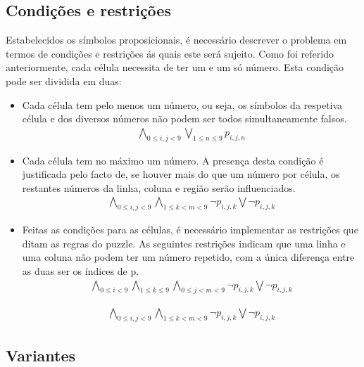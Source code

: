 \documentclass[a4paper,12pt]{article}
\begin{document}
\subsection{Condições e restrições}
Estabelecidos os símbolos proposicionais, é necessário descrever o problema em
termos de condições e restrições ás quais este será sujeito.  Como foi referido
anteriormente, cada célula necessita de ter um e um só número. Esta condição
pode ser dividida em duas:
\begin{itemize}
     \item Cada célula tem pelo menos um número, ou seja, os símbolos da
        respetiva célula e dos diversos números não podem ser todos
        simultaneamente falsos.
        \begin{align}
        \bigwedge_{0\leq i,j < 9}
           \bigvee_{1\leq n \leq 9} p_{i,j,n}
        \end{align}
     
     \item Cada célula tem no máximo um número. A presença desta condição é justificada pelo facto de, se houver mais do que um número por célula, os restantes números da linha, coluna e região serão influenciados.
        \begin{align}
        \bigwedge_{0\leq i,j < 9}
         \bigwedge_{1\leq k < m < 9} \lnot p_{i,j,k}
           \bigvee \lnot p_{i,j,k}
        \end{align}
     
      \item Feitas as condições para as células, é necessário implementar as
         restrições que ditam as regras do puzzle.  As seguintes restrições
         indicam que uma linha e uma coluna não podem ter um número repetido,
         com a única diferença entre as duas ser os índices de p.
         \begin{align}
         \bigwedge_{0\leq i < 9} \bigwedge_{1\leq k \leq 9} \bigwedge_{0\leq j < m
         < 9} \lnot p_{i,j,k}
         \bigvee \lnot p_{i,j,k}
         \end{align}

         \begin{align}
         \bigwedge_{0\leq i,j < 9} \bigwedge_{1\leq k < m < 9} \lnot p_{i,j,k}
         \bigvee \lnot p_{i,j,k}
         \end{align}
\end{itemize}

\subsection{Variantes}
\end{document}
